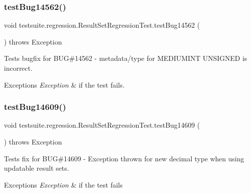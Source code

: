 \subsubsection{\texorpdfstring{test\+Bug14562()}{testBug14562()}}
{\footnotesize\ttfamily void testsuite.\+regression.\+Result\+Set\+Regression\+Test.\+test\+Bug14562 (\begin{DoxyParamCaption}{ }\end{DoxyParamCaption}) throws Exception}

Tests bugfix for B\+UG\#14562 -\/ metadata/type for M\+E\+D\+I\+U\+M\+I\+NT U\+N\+S\+I\+G\+N\+ED is incorrect.


\begin{DoxyExceptions}{Exceptions}
{\em Exception} & if the test fails. \\
\hline
\end{DoxyExceptions}
\mbox{\label{classtestsuite_1_1regression_1_1_result_set_regression_test_a7fc922fe83b42cb83638138be9f5ac4c}} 
\subsubsection{\texorpdfstring{test\+Bug14609()}{testBug14609()}}
{\footnotesize\ttfamily void testsuite.\+regression.\+Result\+Set\+Regression\+Test.\+test\+Bug14609 (\begin{DoxyParamCaption}{ }\end{DoxyParamCaption}) throws Exception}

Tests fix for B\+UG\#14609 -\/ Exception thrown for new decimal type when using updatable result sets.


\begin{DoxyExceptions}{Exceptions}
{\em Exception} & if the test fails \\
\hline
\end{DoxyExceptions}
\mbox{\label{classtestsuite_1_1regression_1_1_result_set_regression_test_af72d1974192a5932470671520ecaecf0}} 
